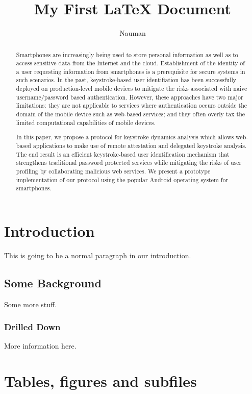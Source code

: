 \documentclass{styles/llncs}
\begin{document}
\title{My First LaTeX Document}
\author{Nauman}

\maketitle
\begin{abstract}
Smartphones are increasingly being used to store personal information as well as to access sensitive data from the Internet and the cloud. Establishment of the identity of a user requesting information from smartphones is a prerequisite for  secure systems in such scenarios. In the past, keystroke-based user identifiation has been successfully deployed on production-level mobile devices to mitigate the risks associated with naive username/password based authentication. However, these approaches have two major limitations: they are not applicable to services where authentication occurs outside the domain of the mobile
device such as web-based services; and they often overly tax the limited computational capabilities of mobile devices.

In this paper, we propose a protocol for keystroke dynamics analysis which allows web-based applications to make use of remote attestation and delegated keystroke analysis. The end result is an efficient keystroke-based user identification mechanism that strengthens traditional password protected services
while mitigating the risks of user profiling by collaborating malicious web
services. We present a prototype implementation of our protocol using
the popular Android operating system for smartphones.
\end{abstract}

\section{Introduction} 
This is going to be a normal paragraph in our introduction. 


\subsection{Some Background} 
Some more stuff. 

\subsubsection{Drilled Down}\label{sec:drilled-down}
More information here. 

\section{Tables, figures and subfiles}\label{sec:background}
\end{document}
